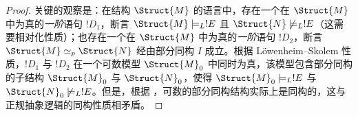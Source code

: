 \documentclass[../../../include/open-logic-section]{subfiles}
\begin{document}
\begin{proof}
关键的观察是：在结构 $\Struct{M}$ 的语言中，存在一个在 $\Struct{M}$ 中为真的\emph{一阶}语句 $!D_1$，断言 $\Struct{M} \models_L !E$ 且 $\Struct{N} \not\models_L !E$（这需要相对化性质）；也存在一个在 $\Struct{M}$ 中为真的\emph{一阶}语句 $!D_2$，断言 $\Struct{M} \simeq_p \Struct{N}$ 经由部分同构 $I$ 成立。根据 Löwenheim--Skolem 性质，$!D_1$ 与 $!D_2$ 在一个可数模型 $\Struct{M}_0$ 中同时为真，该模型包含部分同构的子结构 $\Struct{M}_0$ 与 $\Struct{N}_0$，使得 $\Struct{M}_0 \models_L !E$ 与 $\Struct{N}_0
\not\models_L !E$。但是，根据 ，可数的部分同构结构实际上是同构的，这与正规抽象逻辑的同构性质相矛盾。
\end{proof}
\end{document}

